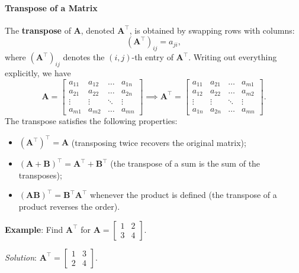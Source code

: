 \paragraph*{Transpose of a Matrix}
The \textbf{transpose} of $ \mathbf{A} $, denoted $ \mathbf{A}^\top $, is obtained by swapping rows with columns:
\begin{equation*}
  (\mathbf{A}^\top)_{ij} = a_{ji},
\end{equation*}
where $(\mathbf{A}^\top)_{ij}$ denotes the $(i,j)$-th entry of $\mathbf{A}^\top$.
Writing out everything explicitly, we have
\begin{equation*}
  \mathbf{A} = \begin{bmatrix} 
    a_{11} & a_{12} & \ldots & a_{1n} \\ 
    a_{21} & a_{22} & \ldots & a_{2n} \\ 
    \vdots & \vdots & \ddots & \vdots \\ 
    a_{m1} & a_{m2} & \ldots & a_{mn}
  \end{bmatrix} \implies
  \mathbf{A}^\top = \begin{bmatrix} 
    a_{11} & a_{21} & \ldots & a_{m1} \\ 
    a_{12} & a_{22} & \ldots & a_{m2} \\ 
    \vdots & \vdots & \ddots & \vdots \\ 
    a_{1n} & a_{2n} & \ldots & a_{mn} 
  \end{bmatrix}.
\end{equation*}
The transpose satisfies the following properties:
\begin{itemize}
    \item $ (\mathbf{A}^\top)^\top = \mathbf{A} $ (transposing twice recovers the original matrix);
    \item $ (\mathbf{A} + \mathbf{B})^\top = \mathbf{A}^\top + \mathbf{B}^\top $ (the transpose of a sum is the sum of the transposes);
    \item $ (\mathbf{A}\mathbf{B})^\top = \mathbf{B}^\top \mathbf{A}^\top $ whenever the product is defined (the transpose of a product reverses the order).
\end{itemize}

\begin{exampleBox}
    \textbf{Example}: Find $ \mathbf{A}^\top $ for $ \mathbf{A} = \begin{bmatrix}1 & 2\\3 & 4\end{bmatrix} $.

    \emph{Solution}: $ \mathbf{A}^\top = \begin{bmatrix}1 & 3\\2 & 4\end{bmatrix} $.
\end{exampleBox}


